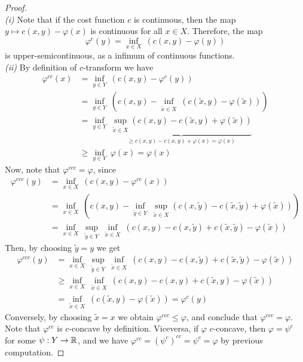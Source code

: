 \documentclass[../main.tex]{subfiles}
\begin{document}
\begin{proof} \ \\
    \textit{(i)} Note that if the cost function $c$ is continuous, then the map $y \mapsto c(x, y) - \varphi(x)$ is continuous for all $x\in X$. Therefore, the map $$\varphi^c(y) = \inf_{x\in X} \ (c(x, y) - \varphi(y))$$ is upper-semicontinuous, as a infimum of continuous functions.\\
    \textit{(ii)} By definition of $c$-transform we have
    \begin{align*}
        \varphi^{cc}(x)
        &= \inf_{y\in Y} \ (c(x, y) - \varphi^c(y)) \\
        &= \inf_{y\in Y} \ (c(x, y) - \inf_{\tilde x\in X} \ (c(\tilde x, y) - \varphi(\tilde x))) \\
        &= \inf_{y\in Y} \ \underbrace{\sup_{\tilde x\in X} (c(x, y) - c(\tilde x, y) + \varphi(\tilde x))}_{\geq c(x, y) - c(x, y) + \varphi(x) = \varphi(x)} \\
        &\geq \inf_{y\in Y} \ \varphi(x) = \varphi(x)
    \end{align*}
    Now, note that $\varphi^{ccc} = \varphi$, since
    \begin{align*}
        \varphi^{ccc}(y) 
        &= \inf_{x\in X} \ (c(x, y) - \varphi^{cc}(x)) \\
        &= \inf_{x\in X} \ (c(x, y) - \inf_{\tilde y\in Y} \ \sup_{\tilde x\in X} (c(x, \tilde y) - c(\tilde x, \tilde y) + \varphi(\tilde x))) \\
        &= \inf_{x\in X} \ \sup_{\tilde y\in Y} \ \inf_{\tilde x \in X} \ (c(x, y) - c(x, \tilde y) + c(\tilde x, \tilde y) - \varphi(\tilde x))
    \end{align*}
    Then, by choosing $\tilde y = y$ we get
    \begin{align*}
        \varphi^{ccc}(y) 
        &=\inf_{x\in X} \ \sup_{\tilde y\in Y} \ \inf_{\tilde x \in X} \ (c(x, y) - c(x, \tilde y) + c(\tilde x, \tilde y) - \varphi(\tilde x)) \\
        &\geq \inf_{x\in X} \ \inf_{\tilde x \in X} \ (c(x, y) - c(x, y) + c(\tilde x, y) - \varphi(\tilde x)) \\
        &= \inf_{\tilde x\in X} \ (c(\tilde x, y) - \varphi(\tilde x)) = \varphi^c(y)
    \end{align*}
    Conversely, by choosing $\tilde x = x$ we obtain $\varphi^{ccc} \leq \varphi$, and conclude that $\varphi^{ccc} = \varphi$. \\
    Note that $\varphi^{cc}$ is $c$-concave by definition. Viceversa, if $\varphi$ $c$-concave, then $\varphi = \psi^{c}$ for some $\psi: Y \to \mathbb{R}$, and we have $\varphi^{cc} = (\psi^c)^{cc} = \psi^c = \varphi$ by previous computation.
\end{proof}
\end{document}
